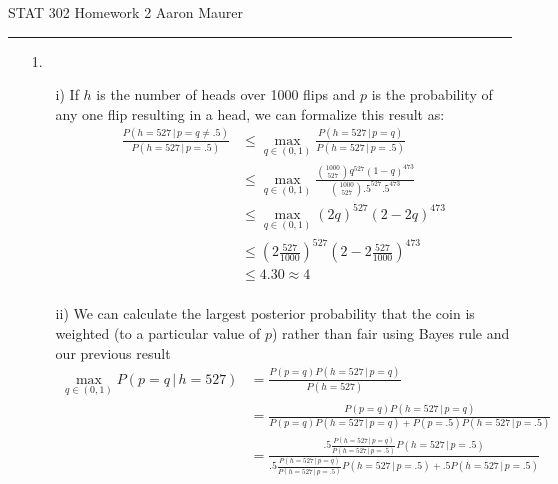 \documentclass[11pt]{article}
\theoremstyle{definition}
\begin{document}
STAT 302 Homework 2 \hfill Aaron Maurer
\vspace{2mm}
\hrule
\vspace{2mm}

\begin{itemize}
    \item[1.]
        \begin{itemize}
            \item[i)]
                If $h$ is the number of heads over 1000 flips and $p$ is the probability of any one flip resulting in a head, we can formalize this result as:
                \begin{align*}
                    \frac{P(h=527 \,|\, p = q \neq .5)}{P(h=527 \,|\, p = .5)} &\leq \max_{q\in(0,1)} \frac{P(h=527 \,|\, p = q)}{P(h=527 \,|\, p = .5)} \\
                                                                   &\leq \max_{q\in(0,1)} \frac{{1000 \choose 527}q^{527}(1-q)^{473}}{{1000 \choose 527}.5^{527}.5^{473}} \\
                                                                   &\leq \max_{q\in(0,1)} (2q)^{527}(2-2q)^{473}\\
                                                                   &\leq \left(2\frac{527}{1000}\right)^{527}\left(2-2\frac{527}{1000}\right)^{473}\\
                                                                   &\leq 4.30 \approx 4\\
                \end{align*}
            \item[ii)]
                We can calculate the largest posterior probability that the coin is weighted (to a particular value of $p$) rather than fair using Bayes rule and our previous result
                \begin{align*}
                    \max_{q\in(0,1)} P(p=q \,|\, h=527) &= \frac{P(p=q) P(h=527 \,|\, p=q)}{P(h=527)} \\
                                                        &= \frac{P(p=q) P(h=527 \,|\, p=q)}{P(p=q) P(h=527 \,|\, p=q)+P(p=.5) P(h=527 \,|\, p=.5)} \\
                                                    &= \frac{.5\frac{P(h=527 \,|\, p = q)}{P(h=527 \,|\, p = .5)}P(h=527 \,|\, p = .5)}{.5\frac{P(h=527 \,|\, p = q)}{P(h=527 \,|\, p = .5)}P(h=527 \,|\, p = .5)+.5P(h=527 \,|\, p = .5)} \\

\end{align*}
\end{itemize}
\end{itemize}
\end{document}
